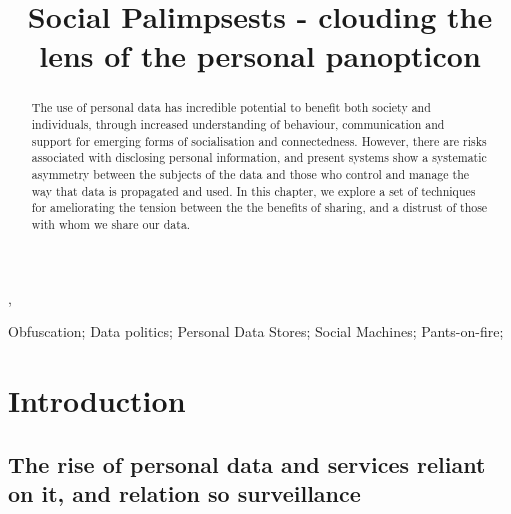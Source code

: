 \documentclass{IOS-Book-Article}     %
\begin{document}
\begin{frontmatter}          %
%
\title{Social Palimpsests - clouding the lens of the personal panopticon}

\author[A]{ },
\author[B]{ }
\author[B]{ }
\address[A]{Centre for Intelligent Systems and Applications,
Department of Informatics, University of Edinburgh}
\address[B]{Southampton}

\begin{abstract}
The use of personal data has incredible potential to benefit both society and
individuals, through increased understanding of behaviour, communication and
support for emerging forms of socialisation and connectedness. However, there
are risks associated with disclosing personal information, and present systems
show a systematic asymmetry between the subjects of the data and those who
control and manage the way that data is propagated and used. In this chapter, we
explore a set of techniques for ameliorating the tension between the 
the benefits of sharing, and a distrust of those with whom we share our data.
\end{abstract}

\begin{keyword}
Obfuscation; Data politics; Personal Data Stores; Social Machines; Pants-on-fire;
\end{keyword}

\end{frontmatter}


\section*{Introduction}

\subsection*{The rise of personal data and services reliant on it, and relation
so surveillance}
\end{document}
